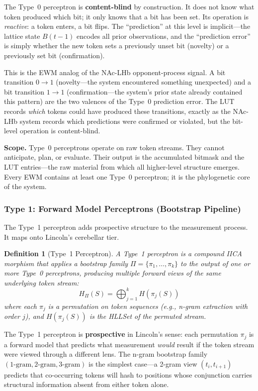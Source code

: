 \documentclass[11pt,a4paper]{article}
\newtheorem{definition}{Definition}[section]
\theoremstyle{remark}
\begin{document}
The Type~0 perceptron is \textbf{content-blind} by construction. It does not
know what token produced which bit; it only knows that a bit has been set. Its
operation is \textit{reactive}: a token enters, a bit flips. The ``prediction''
at this level is implicit---the lattice state $B(t-1)$ encodes all prior
observations, and the ``prediction error'' is simply whether the new token sets
a previously unset bit (novelty) or a previously set bit (confirmation).

This is the EWM analog of the NAc-LHb opponent-process signal. A bit transition
$0 \to 1$ (novelty---the system encountered something unexpected) and a bit
transition $1 \to 1$ (confirmation---the system's prior state already contained
this pattern) are the two valences of the Type~0 prediction error. The LUT
records \textit{which} tokens could have produced these transitions, exactly as
the NAc-LHb system records which predictions were confirmed or violated, but
the bit-level operation is content-blind.

\textbf{Scope.} Type~0 perceptrons operate on raw token streams. They cannot
anticipate, plan, or evaluate. Their output is the accumulated bitmask and the
LUT entries---the raw material from which all higher-level structure emerges.
Every EWM contains at least one Type~0 perceptron; it is the phylogenetic core
of the system.

\subsubsection{Type 1: Forward Model Perceptrons (Bootstrap Pipeline)}

The Type~1 perceptron adds prospective structure to the measurement process. It
maps onto Lincoln's cerebellar tier.

\begin{definition}[Type~1 Perceptron]
A Type~1 perceptron is a compound IICA morphism that applies a bootstrap
family $\Pi = \{\pi_1, \ldots, \pi_k\}$ to the output of one or more
Type~0 perceptrons, producing multiple forward views of the same underlying
token stream:
\begin{equation}
  H_{\Pi}(S) = \bigoplus_{j=1}^{k} H(\pi_j(S))
\end{equation}
where each $\pi_j$ is a permutation on token sequences (e.g., n-gram
extraction with order $j$), and $H(\pi_j(S))$ is the HLLSet of the permuted
stream.
\end{definition}

The Type~1 perceptron is \textbf{prospective} in Lincoln's sense: each
permutation $\pi_j$ is a forward model that predicts what measurement
\textit{would} result if the token stream were viewed through a different lens.
The n-gram bootstrap family $(1\text{-gram}, 2\text{-gram}, 3\text{-gram})$
is the simplest case---a 2-gram view $(t_i, t_{i+1})$ predicts that co-occurring
tokens will hash to positions whose conjunction carries structural information
absent from either token alone.
\end{document}
